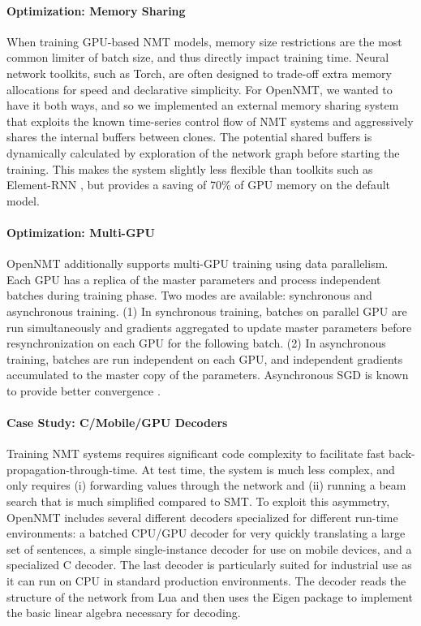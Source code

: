\documentclass[11pt]{article}
\begin{document}
\paragraph{Optimization: Memory Sharing}

When training GPU-based NMT models, memory size restrictions are the
most common limiter of batch size, and thus directly impact training
time. Neural network toolkits, such as Torch, are often designed to
trade-off extra memory allocations for speed and declarative
simplicity. For OpenNMT, we wanted to have it both ways, and so we
implemented an external memory sharing system that exploits the known
time-series control flow of NMT systems and aggressively shares the
internal buffers between clones. The potential shared buffers is dynamically
calculated by exploration of the network graph before starting the
training.  This makes the system slightly less flexible than toolkits
such as Element-RNN \cite{DBLP:journals/corr/LeonardWW15ss}, but
provides a saving of 70\% of GPU memory on the default model. 

\paragraph{Optimization: Multi-GPU} OpenNMT additionally supports multi-GPU
training using data parallelism. Each GPU has a replica of the master parameters
 and process independent batches during training phase.
Two modes are available: synchronous and asynchronous training.
(1) In synchronous training, batches on parallel GPU are run simultaneously and gradients 
aggregated to update master parameters before resynchronization on each GPU for the following batch.
(2) In asynchronous training, batches are run independent on each GPU, and independent gradients accumulated 
to the master copy of the parameters. Asynchronous SGD is known to provide better convergence \cite{xxxx}.

\paragraph{Case Study: C/Mobile/GPU Decoders} Training NMT
systems requires significant code complexity to facilitate fast
back-propagation-through-time. At test time, the
system is much less complex, and only requires (i) forwarding values
through the network and (ii) running a beam search that is much
simplified compared to SMT. To exploit this asymmetry, OpenNMT includes
several different decoders specialized for different run-time
environments: a batched CPU/GPU decoder for very quickly translating a
large set of sentences, a simple single-instance decoder for use on
mobile devices, and a specialized C decoder. The last decoder is
particularly suited for industrial use as it can run on CPU in standard
production environments. The decoder reads the structure of the
network from Lua and then uses the Eigen package to implement the
basic linear algebra necessary for decoding. 
\end{document}
